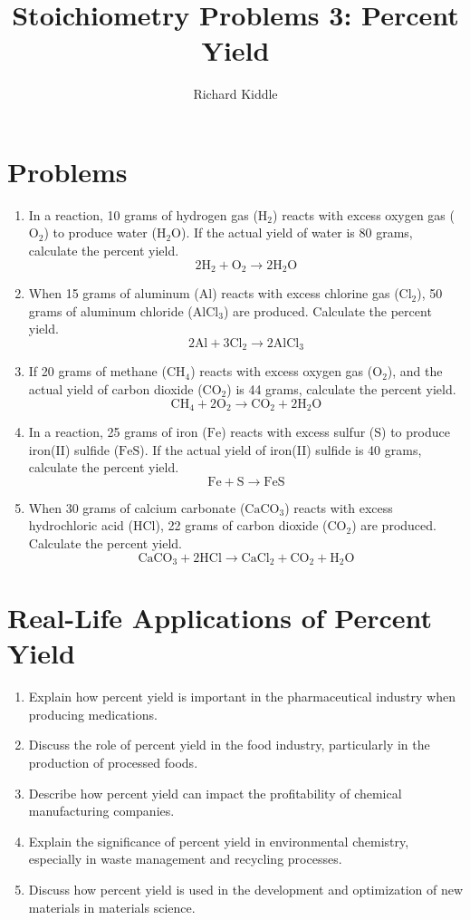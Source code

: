 \documentclass{article}
\title{Stoichiometry Problems 3: Percent Yield}
\author{Richard Kiddle}
\date{}
\begin{document}
\maketitle

\section*{Problems}

\begin{enumerate}
    \item In a reaction, 10 grams of hydrogen gas (\(\text{H}_2\)) reacts with excess oxygen gas (\(\text{O}_2\)) to produce water (\(\text{H}_2\text{O}\)). If the actual yield of water is 80 grams, calculate the percent yield.
    \[
    2\text{H}_2 + \text{O}_2 \rightarrow 2\text{H}_2\text{O}
    \]
    \item When 15 grams of aluminum (\(\text{Al}\)) reacts with excess chlorine gas (\(\text{Cl}_2\)), 50 grams of aluminum chloride (\(\text{AlCl}_3\)) are produced. Calculate the percent yield.
    \[
    2\text{Al} + 3\text{Cl}_2 \rightarrow 2\text{AlCl}_3
    \]
    \item If 20 grams of methane (\(\text{CH}_4\)) reacts with excess oxygen gas (\(\text{O}_2\)), and the actual yield of carbon dioxide (\(\text{CO}_2\)) is 44 grams, calculate the percent yield.
    \[
    \text{CH}_4 + 2\text{O}_2 \rightarrow \text{CO}_2 + 2\text{H}_2\text{O}
    \]
    \item In a reaction, 25 grams of iron (\(\text{Fe}\)) reacts with excess sulfur (\(\text{S}\)) to produce iron(II) sulfide (\(\text{FeS}\)). If the actual yield of iron(II) sulfide is 40 grams, calculate the percent yield.
    \[
    \text{Fe} + \text{S} \rightarrow \text{FeS}
    \]
    \item When 30 grams of calcium carbonate (\(\text{CaCO}_3\)) reacts with excess hydrochloric acid (\(\text{HCl}\)), 22 grams of carbon dioxide (\(\text{CO}_2\)) are produced. Calculate the percent yield.
    \[
    \text{CaCO}_3 + 2\text{HCl} \rightarrow \text{CaCl}_2 + \text{CO}_2 + \text{H}_2\text{O}
    \]
\end{enumerate}

\section*{Real-Life Applications of Percent Yield}

\begin{enumerate}
    \item Explain how percent yield is important in the pharmaceutical industry when producing medications.
    \item Discuss the role of percent yield in the food industry, particularly in the production of processed foods.
    \item Describe how percent yield can impact the profitability of chemical manufacturing companies.
    \item Explain the significance of percent yield in environmental chemistry, especially in waste management and recycling processes.
    \item Discuss how percent yield is used in the development and optimization of new materials in materials science.
\end{enumerate}
\end{document}
